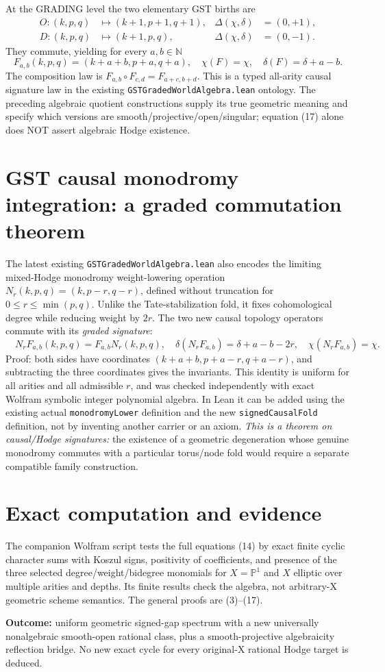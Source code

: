 \documentclass[11pt]{article}
\begin{document}
At the GRADING level the two elementary GST births are
\[
 \begin{aligned}
 O:(k,p,q)&\mapsto(k+1,p+1,q+1),
    &\Delta(\chi,\delta)&=(0,+1),\\
 D:(k,p,q)&\mapsto(k+1,p,q),
    &\Delta(\chi,\delta)&=(0,-1).
 \end{aligned}
\]
They commute, yielding for every $a,b\in\mathbb N$
\[
 \boxed{F_{a,b}(k,p,q)
  =(k+a+b,p+a,q+a),\quad
  \chi(F)=\chi,\quad
  \delta(F)=\delta+a-b.}                               \tag{17}
\]
The composition law is
$F_{a,b}\circ F_{c,d}=F_{a+c,b+d}$.
This is a typed all-arity causal signature law in the
existing \texttt{GSTGradedWorldAlgebra.lean} ontology.
The preceding algebraic quotient constructions supply
its true geometric meaning and specify which versions
are smooth/projective/open/singular; equation (17)
alone does NOT assert algebraic Hodge existence.

\section{GST causal monodromy integration: a graded commutation theorem}
The latest existing \texttt{GSTGradedWorldAlgebra.lean} also encodes
the limiting mixed-Hodge monodromy weight-lowering operation
$N_r(k,p,q)=(k,p-r,q-r)$, defined without truncation for
$0\le r\le\min(p,q)$. Unlike the Tate-stabilization fold,
it fixes cohomological degree while reducing weight by $2r$.
The two new causal topology operators commute with its
\emph{graded signature}:
\[
 \boxed{\quad
 N_r F_{a,b}(k,p,q)=F_{a,b}N_r(k,p,q),\quad
 \delta(N_r F_{a,b})=\delta+a-b-2r,\quad
 \chi(N_r F_{a,b})=\chi.
 \quad}                                                \tag{20}
\]
Proof: both sides have coordinates
$(k+a+b,p+a-r,q+a-r)$, and subtracting the three
coordinates gives the invariants. This identity is
uniform for all arities and all admissible $r$, and
was checked independently with exact Wolfram symbolic
integer polynomial algebra. In Lean it can be added
using the existing actual \texttt{monodromyLower} definition
and the new \texttt{signedCausalFold} definition, not
by inventing another carrier or an axiom.
\emph{This is a theorem on causal/Hodge signatures:}
the existence of a geometric degeneration whose genuine
monodromy commutes with a particular torus/node fold
would require a separate compatible family construction.

\section{Exact computation and evidence}
The companion Wolfram script tests the full
equations (14) by exact finite cyclic character sums
with Koszul signs, positivity of coefficients, and
presence of the three selected degree/weight/bidegree
monomials for $X=\mathbb P^1$ and $X$ elliptic over
multiple arities and depths. Its finite results check
the algebra, not arbitrary-X geometric scheme semantics.
The general proofs are (3)--(17).

\textbf{Outcome:} uniform geometric signed-gap spectrum
with a new universally nonalgebraic smooth-open
rational class, plus a smooth-projective algebraicity
reflection bridge. No new exact cycle for every
original-X rational Hodge target is deduced.
\end{document}
